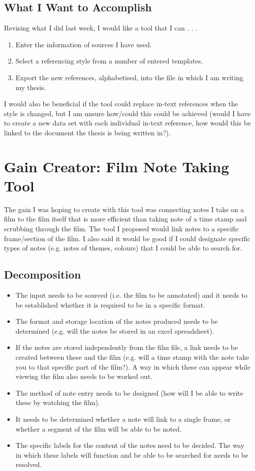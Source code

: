 \documentclass{article}
\begin{document}
\subsection*{What I Want to Accomplish}
Revising what I did last week, I would like a tool that I can . . .
\begin{enumerate}
\item Enter the information of sources I have used.
\item Select a referencing style from a number of entered templates.
\item Export the new references, alphabetised, into the file in which I am writing my thesis. 
\end{enumerate}
I would also be beneficial if the tool could replace in-text references when the style is changed, but I am unsure how/could this could be achieved (would I have to create a new data set with each individual in-text reference, how would this be linked to the document the thesis is being written in?).

\pagebreak

\section{Gain Creator: Film Note Taking Tool}
The gain I was hoping to create with this tool was connecting notes I take on a film to the film itself that is more efficient than taking note of a time stamp and scrubbing through the film. The tool I proposed would link notes to a specific frame/section of the film. I also said it would be good if I could designate specific types of notes (e.g. notes of themes, colours) that I could be able to search for.

\subsection*{Decomposition}
\begin{itemize}
\item The input needs to be sourced (i.e. the film to be annotated) and it needs to be established whether it is required to be in a specific format.
\item The format and storage location of the notes produced needs to be determined (e.g. will the notes be stored in an excel spreadsheet).
\item If the notes are stored independently from the film file, a link needs to be created between these and the film (e.g. will a time stamp with the note take you to that specific part of the film?). A way in which these can appear while viewing the film also needs to be worked out.
\item The method of note entry needs to be designed (how will I be able to write these by watching the film).
\item It needs to be determined whether a note will link to a single frame, or whether a segment of the film will be able to be noted.
\item The specific labels for the content of the notes need to be decided. The way in which these labels will function and be able to be searched for needs to be resolved.
\end{itemize}
\end{document}
